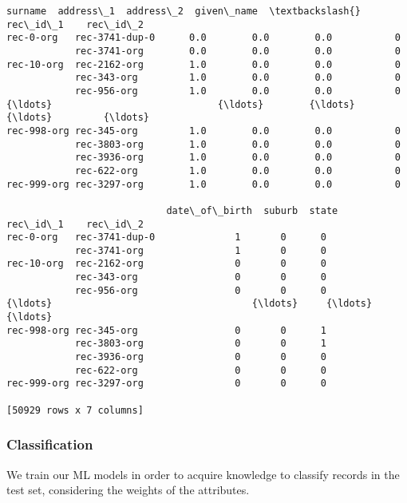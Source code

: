 \documentclass{article}
\begin{document}
    \begin{Verbatim}[commandchars=\\\{\}]

\end{Verbatim}
\begin{Verbatim}[commandchars=\\\{\}]
                            surname  address\_1  address\_2  given\_name  \textbackslash{}
rec\_id\_1    rec\_id\_2                                                    
rec-0-org   rec-3741-dup-0      0.0        0.0        0.0           0   
            rec-3741-org        0.0        0.0        0.0           0   
rec-10-org  rec-2162-org        1.0        0.0        0.0           0   
            rec-343-org         1.0        0.0        0.0           0   
            rec-956-org         1.0        0.0        0.0           0   
{\ldots}                             {\ldots}        {\ldots}        {\ldots}         {\ldots}   
rec-998-org rec-345-org         1.0        0.0        0.0           0   
            rec-3803-org        1.0        0.0        0.0           0   
            rec-3936-org        1.0        0.0        0.0           0   
            rec-622-org         1.0        0.0        0.0           0   
rec-999-org rec-3297-org        1.0        0.0        0.0           0   

                            date\_of\_birth  suburb  state  
rec\_id\_1    rec\_id\_2                                      
rec-0-org   rec-3741-dup-0              1       0      0  
            rec-3741-org                1       0      0  
rec-10-org  rec-2162-org                0       0      0  
            rec-343-org                 0       0      0  
            rec-956-org                 0       0      0  
{\ldots}                                   {\ldots}     {\ldots}    {\ldots}  
rec-998-org rec-345-org                 0       0      1  
            rec-3803-org                0       0      1  
            rec-3936-org                0       0      0  
            rec-622-org                 0       0      0  
rec-999-org rec-3297-org                0       0      0  

[50929 rows x 7 columns]
\end{Verbatim}
    \hypertarget{classification}{%
\subsubsection{Classification}\label{classification}}

We train our ML models in order to acquire knowledge to classify records
in the test set, considering the weights of the attributes.
\end{document}
